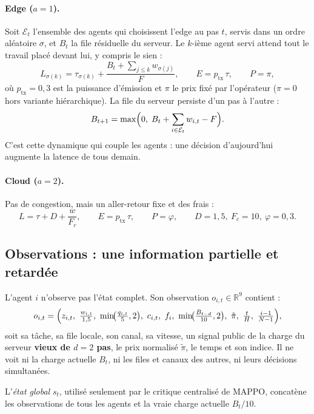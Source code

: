 \documentclass[11pt,a4paper]{article}
\newcommand{\R}{\mathbb{R}}
\begin{document}
\paragraph{Edge ($a=1$).} Soit $\mathcal{E}_t$ l'ensemble des agents qui choisissent l'edge au pas $t$, servis
dans un ordre aléatoire $\sigma$, et $B_t$ la file résiduelle du serveur. Le $k$-ième agent servi attend tout
le travail placé devant lui, y compris le sien :
\[
  L_{\sigma(k)} = \tau_{\sigma(k)} + \frac{B_t+\sum_{j\le k} w_{\sigma(j)}}{F},
  \qquad E=p_{\mathrm{tx}}\,\tau,\qquad P=\pi ,
\]
où $p_{\mathrm{tx}}=0{,}3$ est la puissance d'émission et $\pi$ le prix fixé par l'opérateur ($\pi=0$ hors
variante hiérarchique). La file du serveur persiste d'un pas à l'autre :
\begin{equation}
  B_{t+1}=\max\Bigl(0,\;B_t+\sum_{i\in\mathcal{E}_t} w_{i,t}-F\Bigr).
  \label{eq:file}
\end{equation}
C'est cette dynamique qui couple les agents : une décision d'aujourd'hui augmente la latence de tous demain.

\paragraph{Cloud ($a=2$).} Pas de congestion, mais un aller-retour fixe et des frais :
\[
  L=\tau+D+\frac{w}{F_c},\qquad E=p_{\mathrm{tx}}\,\tau,\qquad P=\varphi,
  \qquad D=1{,}5,\ F_c=10,\ \varphi=0{,}3 .
\]

\subsection{Observations : une information partielle et retardée}

L'agent $i$ n'observe pas l'état complet. Son observation $o_{i,t}\in\R^9$ contient :
\[
  o_{i,t}=\Bigl(z_{i,t},\ \tfrac{w_{i,t}}{1{,}5},\ \min\!\bigl(\tfrac{q_{i,t}}{5},2\bigr),\ c_{i,t},\ f_i,\
  \min\!\bigl(\tfrac{B_{t-d}}{10},2\bigr),\ \tilde\pi,\ \tfrac{t}{H},\ \tfrac{i-1}{N-1}\Bigr),
\]
soit sa tâche, sa file locale, son canal, sa vitesse, un signal public de la charge du serveur \textbf{vieux de
$d=2$ pas}, le prix normalisé $\tilde\pi$, le temps et son indice. Il ne voit ni la charge actuelle $B_t$, ni les
files et canaux des autres, ni leurs décisions simultanées.

L'\emph{état global} $s_t$, utilisé seulement par le critique centralisé de MAPPO, concatène les observations de
tous les agents et la vraie charge actuelle $B_t/10$.
\end{document}
